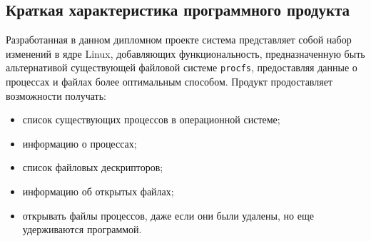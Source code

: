 









\FPround{}


\subsection{Краткая характеристика программного продукта}

Разработанная в данном дипломном проекте система представляет собой набор
изменений в ядре Linux, добавляющих функциональность, предназначенную быть
альтернативой существующей файловой системе \texttt{procfs}, предоставляя данные
о процессах и файлах более оптимальным способом. Продукт продоставляет
возможности получать:
\begin{itemize}
\item список существующих процессов в операционной системе;
\item информацию о процессах;
\item список файловых дескрипторов;
\item информацию об открытых файлах;
\item открывать файлы процессов, даже если они были удалены, но еще удерживаются
  программой.
\end{itemize}

